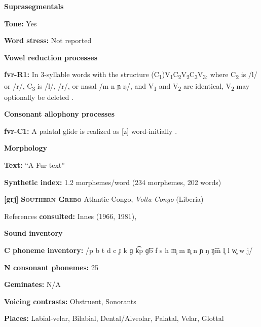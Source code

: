 \textbf{Suprasegmentals}



\textbf{Tone:} Yes



\textbf{Word stress:} Not reported



\textbf{Vowel reduction processes}



\textbf{fvr-R1:} In 3-syllable words with the structure (C\textsubscript{1})V\textsubscript{1}C\textsubscript{2}V\textsubscript{2}C\textsubscript{3}V\textsubscript{3}, where C\textsubscript{2} is /l/ or /r/, C\textsubscript{3} is /l/, /r/, or nasal /m n ɲ ŋ/, and V\textsubscript{1} and V\textsubscript{2} are identical, V\textsubscript{2} may optionally be deleted \citep[60-61]{Jakobi1990}.



\textbf{Consonant allophony processes}



\textbf{fvr-C1:} A palatal glide is realized as [z] word-initially \citep[19]{Jakobi1990}.



\textbf{Morphology}



\textbf{Text:} “A Fur text” \citep[125-127]{Jakobi1990}



\textbf{Synthetic index:} 1.2 morphemes/word (234 morphemes, 202 words)



\textbf{[grj]}   \textbf{\textsc{Southern Grebo}}  Atlantic-Congo, \textit{Volta-Congo} (Liberia)



References \textbf{consulted:} Innes (1966, 1981), \citet{Newman1986}



\textbf{Sound inventory}



\textbf{C phoneme inventory:} /p b t d c ɟ k ɡ k͡p ɡ͡b f s h m̥ m n̥ n ɲ ŋ ŋ͡m l̥ l w̥ w j/



\textbf{N consonant phonemes:} 25



\textbf{Geminates:} N/A



\textbf{Voicing contrasts:} Obstruent, Sonorants



\textbf{Places:} Labial-velar, Bilabial, Dental/Alveolar, Palatal, Velar, Glottal



